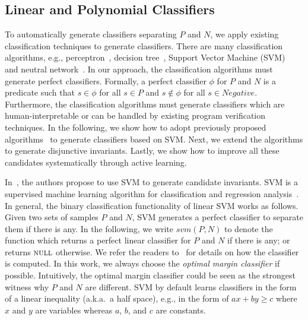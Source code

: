 \subsection{Linear and Polynomial Classifiers}
To automatically generate classifiers separating $P$ and $N$, we apply existing classification techniques to generate classifiers. There are many classification algorithms, e.g., perceptron~\cite{perceptron}, decision tree~\cite{quinlan1986induction}, Support Vector Machine (SVM)~\cite{svm:original} and neutral network~\cite{nn}.
In our approach, the classification algorithms must generate perfect classifiers. Formally, a perfect classifier $\phi$ for $P$ and $N$ is a predicate such that $s \in \phi$ for all $s \in P$ and $s \not \in \phi$ for all $s \in Negative$. Furthermore, the classification algorithms must generate classifiers which are human-interpretable or can be handled by existing program verification techniques.
In the following, we show how to adopt previously proposed algorithms~\cite{sharma2012interpolants} to generate classifiers based on SVM. Next, we extend the algorithms to generate disjunctive invariants. Lastly, we show how to improve all these candidates systematically through active learning.

In~\cite{sharma2012interpolants}, the authors propose to use SVM to generate candidate invariants. SVM is a supervised machine learning algorithm for classification and regression analysis~\cite{svm:original}.
In general, the binary classification functionality of linear SVM works as follows. Given two sets of samples $P$ and $N$, SVM generates a perfect classifier to separate them if there is any.
In the following, we write $svm(P, N)$ to denote the function which returns a perfect linear classifier for $P$ and $N$ if there is any; or returns $\textsc{null}$ otherwise. We refer the readers to~\cite{svm:smo} for details on how the classifier is computed. In this work, we always choose the \textit{optimal margin classifier} if possible. Intuitively, the optimal margin classifier could be seen as the strongest witness why $P$ and $N$ are different.
SVM by default learns classifiers in the form of a linear inequality (a.k.a.~a half space), e.g., in the form of $a x + b y \geq c$ where $x$ and $y$ are variables whereas $a$, $b$, and $c$ are constants.

